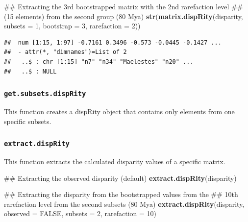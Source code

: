 \documentclass[]{book}
\newenvironment{Shaded}{\begin{snugshade}}{\end{snugshade}}
\newcommand{\KeywordTok}[1]{\textcolor[rgb]{0.13,0.29,0.53}{\textbf{#1}}}
\newcommand{\DataTypeTok}[1]{\textcolor[rgb]{0.13,0.29,0.53}{#1}}
\newcommand{\DecValTok}[1]{\textcolor[rgb]{0.00,0.00,0.81}{#1}}
\newcommand{\StringTok}[1]{\textcolor[rgb]{0.31,0.60,0.02}{#1}}
\newcommand{\OtherTok}[1]{\textcolor[rgb]{0.56,0.35,0.01}{#1}}
\newcommand{\OperatorTok}[1]{\textcolor[rgb]{0.81,0.36,0.00}{\textbf{#1}}}
\newcommand{\NormalTok}[1]{#1}
\theoremstyle{definition}
\theoremstyle{definition}
\theoremstyle{remark}
\begin{document}
\begin{Shaded}
\begin{Highlighting}[]
\NormalTok{## Extracting the 3rd bootstrapped matrix with the 2nd rarefaction level}
\NormalTok{## (15 elements) from the second group (80 Mya)}
\KeywordTok{str}\NormalTok{(}\KeywordTok{matrix.dispRity}\NormalTok{(disparity, }\DataTypeTok{subsets =} \DecValTok{1}\NormalTok{, }\DataTypeTok{bootstrap =} \DecValTok{3}\NormalTok{, }\DataTypeTok{rarefaction =} \DecValTok{2}\NormalTok{))}
\end{Highlighting}
\end{Shaded}

\begin{verbatim}
##  num [1:15, 1:97] -0.7161 0.3496 -0.573 -0.0445 -0.1427 ...
##  - attr(*, "dimnames")=List of 2
##   ..$ : chr [1:15] "n7" "n34" "Maelestes" "n20" ...
##   ..$ : NULL
\end{verbatim}

\subsubsection{\texorpdfstring{\texttt{get.subsets.dispRity}}{get.subsets.dispRity}}\label{get.subsets.disprity}

This function creates a dispRity object that contains only elements from
one specific subsets.

\begin{Shaded}
\end{Shaded}

\subsubsection{\texorpdfstring{\texttt{extract.dispRity}}{extract.dispRity}}\label{extract.disprity}

This function extracts the calculated disparity values of a specific
matrix.

\begin{Shaded}
\begin{Highlighting}[]
\NormalTok{## Extracting the observed disparity (default)}
\KeywordTok{extract.dispRity}\NormalTok{(disparity)}

\NormalTok{## Extracting the disparity from the bootstrapped values from the}
\NormalTok{## 10th rarefaction level from the second subsets (80 Mya)}
\KeywordTok{extract.dispRity}\NormalTok{(disparity, }\DataTypeTok{observed =} \OtherTok{FALSE}\NormalTok{, }\DataTypeTok{subsets =} \DecValTok{2}\NormalTok{, }\DataTypeTok{rarefaction =} \DecValTok{10}\NormalTok{)}
\end{Highlighting}
\end{Shaded}
\end{document}
